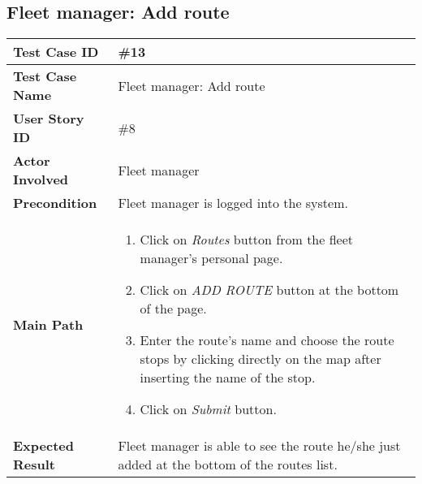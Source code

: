 \subsection{Fleet manager: Add route}
\begin{center}
	\begin{tabular} { | m{3.5cm} | m{9.5cm} | }
		\hline
		\textbf{Test Case ID} & \#13\\
		\hline
		\textbf{Test Case Name} & Fleet manager: Add route\\
		\hline
		\textbf{User Story ID} & \#8 \\
		\hline
		\textbf{Actor Involved} & Fleet manager\\
		\hline
		\textbf{Precondition} & Fleet manager is logged into the system.\\
		\hline
		\textbf{Main Path} & 
		\begin{enumerate}
			\item Click on \textit{Routes} button from the fleet manager's personal page.
			\item Click on \textit{ADD ROUTE} button at the bottom of the page.
			\item Enter the route's name and choose the route stops by clicking directly on the map after inserting the name of the stop.
			\item Click on \textit{Submit} button.
		\end{enumerate}\\
		\hline
		\textbf{Expected Result} & Fleet manager is able to see the route he/she just added at the bottom of the routes list.\\
		\hline
	\end{tabular}
\end{center}
\newpage
